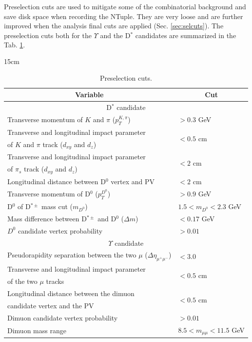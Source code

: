 Preselection cuts are used to mitigate some of the combinatorial background and save disk space when recording the NTuple. They are very loose and are further improved when the analysis final cuts are applied (Sec. \ref{sec:selcuts}). The preselection cuts both for the $\Upsilon$ and the D$^*$ candidates are summarized in the Tab. \ref{tab:preselectioncuts}.

\begin{table}[!htbp]{15cm}
  \caption{Preselection cuts.}
  \begin{tabular}{ l | l }
    \hline
    \multicolumn{1}{c|}{Variable} & \multicolumn{1}{|c}{Cut} \\ \hline
    \multicolumn{2}{c}{D$^*$ candidate} \\ \hline
    Transverse momentum of $K$ and $\pi$ ($p_T^{K, \pi}$) & $> 0.3$ GeV \\ \hline
    Transverse and longitudinal impact parameter & \multirow[c]{2}{*}{$< 0.5$ cm} \\ 
    of $K$ and $\pi$ track ($d_{xy}$ and $d_z$) & \\ \hline
    Transverse and longitudinal impact parameter & \multirow[c]{2}{*}{$< 2$ cm} \\ 
    of $\pi_s$ track ($d_{xy}$ and $d_z$) & \\ \hline
    Longitudinal distance between D$^0$ vertex and PV & $< 2$ cm \\ \hline
    Transverse momentum of D$^0$ ($p_T^{D^0}$) & $> 0.9$ GeV \\ \hline
    D$^0$ of D$^{*\pm}$ mass cut ($m_{D^0}$) & $1.5 < m_{D^0} < 2.3$ GeV \\ \hline
    Mass difference between D$^{*\pm}$ and D$^0$ ($\Delta m$) & $< 0.17$ GeV \\ \hline
    $D^0$ candidate vertex probability & $> 0.01$ \\ \hline

    \multicolumn{2}{c}{$\Upsilon$ candidate} \\ \hline
    Pseudorapidity separation between the two $\mu$ ($\Delta\eta_{\mu^+\mu^-}$) & $< 3.0$ \\ \hline
    Transverse and longitudinal impact parameter & \multirow[c]{2}{*}{$< 0.5$ cm} \\ 
    of the two $\mu$ tracks & \\ \hline
    Longitudinal distance between the dimuon & \multirow[c]{2}{*}{$< 0.5$ cm} \\ 
    candidate vertex and the PV & \\ \hline
    Dimuon candidate vertex probability & $> 0.01$ \\ \hline
    Dimuon mass range & $8.5 < m_{\mu\mu} < 11.5$ GeV \\ \hline
  \end{tabular}
  \label{tab:preselectioncuts}
\end{table}

